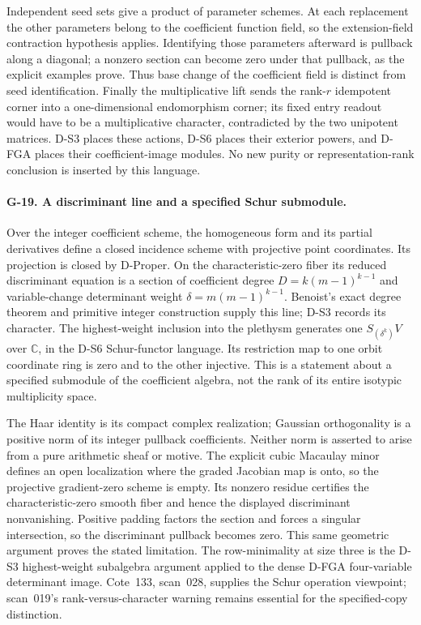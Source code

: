 Independent seed sets give a product of parameter schemes.
At each replacement the other parameters belong to the
coefficient function field, so the extension-field contraction
hypothesis applies. Identifying those parameters afterward is
pullback along a diagonal; a nonzero section can become zero
under that pullback, as the explicit examples prove. Thus
base change of the coefficient field is distinct from seed
identification. Finally the multiplicative lift sends the
rank-$r$ idempotent corner into a one-dimensional endomorphism
corner; its fixed entry readout would have to be a multiplicative
character, contradicted by the two unipotent matrices. D-S3
places these actions, D-S6 places their exterior powers, and
D-FGA places their coefficient-image modules. No new purity
or representation-rank conclusion is inserted by this language.

\paragraph{G-19. A discriminant line and a specified Schur submodule.}
Over the integer coefficient scheme, the homogeneous form and
its partial derivatives define a closed incidence scheme with
projective point coordinates. Its projection is closed by
D-Proper. On the characteristic-zero fiber its reduced
discriminant equation is a section of coefficient degree
$D=k(m-1)^{k-1}$ and variable-change determinant weight
$\delta=m(m-1)^{k-1}$. Benoist's exact degree theorem and
primitive integer construction supply this line; D-S3 records
its character. The highest-weight inclusion into the plethysm
generates one $S_{(\delta^k)}V$ over $\mathbb C$, in the D-S6
Schur-functor language. Its restriction map to one orbit
coordinate ring is zero and to the other injective. This is
a statement about a specified submodule of the coefficient
algebra, not the rank of its entire isotypic multiplicity space.

The Haar identity is its compact complex realization; Gaussian
orthogonality is a positive norm of its integer pullback
coefficients. Neither norm is asserted to arise from a pure
arithmetic sheaf or motive. The explicit cubic Macaulay minor
defines an open localization where the graded Jacobian map
is onto, so the projective gradient-zero scheme is empty.
Its nonzero residue certifies the characteristic-zero smooth
fiber and hence the displayed discriminant nonvanishing.
Positive padding factors the section and forces a singular
intersection, so the discriminant pullback becomes zero.
This same geometric argument proves the stated limitation.
The row-minimality at size three is the D-S3 highest-weight
subalgebra argument applied to the dense D-FGA four-variable
determinant image. Cote~133, scan~028, supplies the Schur
operation viewpoint; scan~019's rank-versus-character warning
remains essential for the specified-copy distinction.


